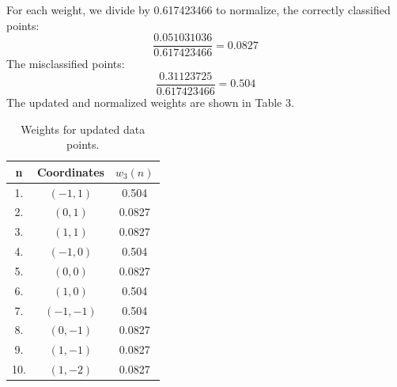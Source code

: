 \documentclass[a3paper,12pt]{extarticle} %
\begin{document}
\begin{enumerate}
\[\]
For each weight, we divide by 0.617423466 to normalize, the correctly classified points:
\[
\frac{0.051031036}{0.617423466} = 0.0827
\]
The misclassified points:
\[
\frac{0.31123725}{0.617423466} = 0.504
\]
The updated and normalized weights are shown in Table 3.
\begin{table}[h!]
    \centering
    \begin{tabular}{|c|c|c|}
    \hline
    \textbf{n} & \textbf{Coordinates} & \textbf{$w_3(n)$} \\ \hline
    1. & $(-1, 1)$ & 0.504  \\ \hline
    2. & $(0, 1)$ & 0.0827\\ \hline
    3. & $(1, 1)$ & 0.0827\\ \hline
    4. & $(-1, 0)$ & 0.504  \\ \hline
    5. & $(0, 0)$ & 0.0827 \\ \hline
    6. & $(1, 0)$ & 0.504  \\ \hline
    7. & $(-1, -1)$ & 0.504 \\ \hline
    8. & $(0, -1)$ & 0.0827 \\ \hline
    9. & $(1, -1)$ & 0.0827 \\ \hline
    10. & \((1, -2)\) & 0.0827 \\ \hline
    \end{tabular}
    \caption{Weights for updated data points.}
    \label{table:weights}
\end{table}


\end{enumerate}
\end{document}
